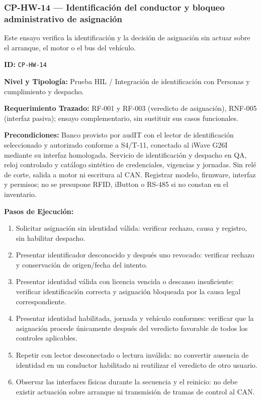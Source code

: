 \subsubsection*{CP-HW-14 — Identificación del conductor y bloqueo administrativo de asignación}\label{sec:9-cp-hw-14}
Este ensayo verifica la identificación y la decisión de asignación sin actuar sobre el arranque, el motor o el bus del vehículo.

\par\noindent \textbf{ID:} \texttt{CP-\allowbreak{}HW-\allowbreak{}14}\par
\par\noindent \textbf{Nivel y Tipología:} Prueba HIL / Integración de identificación con Personas y cumplimiento y despacho.\par
\par\noindent \textbf{Requerimiento Trazado:} RF-001 y RF-003 (veredicto de asignación), RNF-005 (interfaz pasiva); ensayo complementario, sin sustituir sus casos funcionales.\par
\par\noindent \textbf{Precondiciones:} Banco provisto por audIT con el lector de identificación seleccionado y autorizado conforme a S4/T-11, conectado al iWave G26I mediante su interfaz homologada. Servicio de identificación y despacho en QA, reloj controlado y catálogo sintético de credenciales, vigencias y jornadas. Sin relé de corte, salida a motor ni escritura al CAN. Registrar modelo, firmware, interfaz y permisos; no se presupone RFID, iButton o RS-485 si no constan en el inventario.\par
\par\noindent \textbf{Pasos de Ejecución:}\par
\begin{enumerate}
\item Solicitar asignación sin identidad válida: verificar rechazo, causa y registro, sin habilitar despacho.
\item Presentar identificador desconocido y después uno revocado: verificar rechazo y conservación de origen/fecha del intento.
\item Presentar identidad válida con licencia vencida o descanso insuficiente: verificar identificación correcta y asignación bloqueada por la causa legal correspondiente.
\item Presentar identidad habilitada, jornada y vehículo conformes: verificar que la asignación procede únicamente después del veredicto favorable de todos los controles aplicables.
\item Repetir con lector desconectado o lectura inválida: no convertir ausencia de identidad en un conductor habilitado ni reutilizar el veredicto de otro usuario.
\item Observar las interfaces físicas durante la secuencia y el reinicio: no debe existir actuación sobre arranque ni transmisión de tramas de control al CAN.
\end{enumerate}

